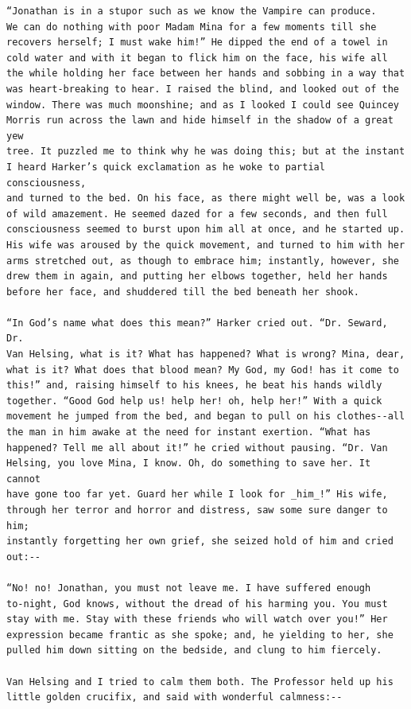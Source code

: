 \documentclass{article}
\begin{document}
\begin{verbatim}
“Jonathan is in a stupor such as we know the Vampire can produce.
We can do nothing with poor Madam Mina for a few moments till she
recovers herself; I must wake him!” He dipped the end of a towel in
cold water and with it began to flick him on the face, his wife all
the while holding her face between her hands and sobbing in a way that
was heart-breaking to hear. I raised the blind, and looked out of the
window. There was much moonshine; and as I looked I could see Quincey
Morris run across the lawn and hide himself in the shadow of a great yew
tree. It puzzled me to think why he was doing this; but at the instant
I heard Harker’s quick exclamation as he woke to partial consciousness,
and turned to the bed. On his face, as there might well be, was a look
of wild amazement. He seemed dazed for a few seconds, and then full
consciousness seemed to burst upon him all at once, and he started up.
His wife was aroused by the quick movement, and turned to him with her
arms stretched out, as though to embrace him; instantly, however, she
drew them in again, and putting her elbows together, held her hands
before her face, and shuddered till the bed beneath her shook.

“In God’s name what does this mean?” Harker cried out. “Dr. Seward, Dr.
Van Helsing, what is it? What has happened? What is wrong? Mina, dear,
what is it? What does that blood mean? My God, my God! has it come to
this!” and, raising himself to his knees, he beat his hands wildly
together. “Good God help us! help her! oh, help her!” With a quick
movement he jumped from the bed, and began to pull on his clothes--all
the man in him awake at the need for instant exertion. “What has
happened? Tell me all about it!” he cried without pausing. “Dr. Van
Helsing, you love Mina, I know. Oh, do something to save her. It cannot
have gone too far yet. Guard her while I look for _him_!” His wife,
through her terror and horror and distress, saw some sure danger to him;
instantly forgetting her own grief, she seized hold of him and cried
out:--

“No! no! Jonathan, you must not leave me. I have suffered enough
to-night, God knows, without the dread of his harming you. You must
stay with me. Stay with these friends who will watch over you!” Her
expression became frantic as she spoke; and, he yielding to her, she
pulled him down sitting on the bedside, and clung to him fiercely.

Van Helsing and I tried to calm them both. The Professor held up his
little golden crucifix, and said with wonderful calmness:--


\end{verbatim}
\end{document}
